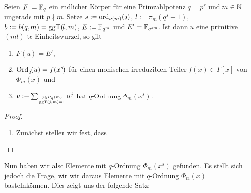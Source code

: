 \begin{satz}
  \label{satz:konstruktion_q_ordnung_reg}
  Seien $F := \mathbb{F}_q$ ein endlicher Körper für eine Primzahlpotenz $q = p^r$ 
  und $m\in\mathbb{N}$ ungerade mit $p\nmid m$.
  Setze $s := \operatorname{ord}_{\nu(m)}(q)$, 
  $l := \pi_m(q^s-1)$, $b:= b(q,m) = \operatorname{ggT}(l,m)$, $E := \mathbb{F}_{q^m}$ und
  $E' = \mathbb{F}_{q^{sm}}$. Ist dann
  $u$ eine primitive $(ml)$-te Einheitswurzel, so gilt
  \begin{enumerate}
    \item $F(u) = E'$,
    \item $\operatorname{Ord}_q(u) = f(x^s)$ für einen monischen irreduziblen Teiler 
      $f(x) \in F[x]$ von $\Phi_m(x)$ und 
    \item $v := \sum_{j \in R_q(m)\atop \operatorname{ggT}(j,m)=1} 
      u^j$ hat $q$-Ordnung $\Phi_m(x^s)$.
  \end{enumerate}
\end{satz}
\begin{proof}
  \begin{enumerate}
    \item Zunächst stellen wir fest, dass 
  \end{enumerate}
\end{proof}

Nun haben wir also Elemente mit $q$-Ordnung $\Phi_m(x^s)$ gefunden. Es stellt
sich jedoch die Frage, wir wir daraus Elemente mit $q$-Ordnung $\Phi_m(x)$ 
\glqq basteln\grqq können. Dies zeigt uns der folgende Satz:

